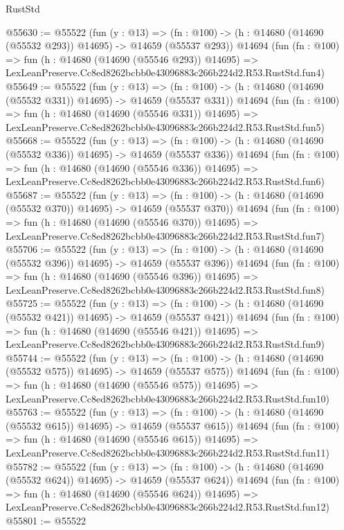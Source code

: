 \begin{lexlean}{RustStd}
\begin{coremodule}
@55630 := @55522
    (fun (y : @13) =>
    (fn : @100) -> (h : @14680 (@14690 (@55532 @293)) @14695) -> @14659 (@55537 @293))
    @14694
    (fun (fn : @100) =>
    fun (h : @14680 (@14690 (@55546 @293)) @14695) =>
    LexLeanPreserve.Cc8ed8262bcbb0e43096883c266b224d2.R53.RustStd.fun4)
@55649 := @55522
    (fun (y : @13) =>
    (fn : @100) -> (h : @14680 (@14690 (@55532 @331)) @14695) -> @14659 (@55537 @331))
    @14694
    (fun (fn : @100) =>
    fun (h : @14680 (@14690 (@55546 @331)) @14695) =>
    LexLeanPreserve.Cc8ed8262bcbb0e43096883c266b224d2.R53.RustStd.fun5)
@55668 := @55522
    (fun (y : @13) =>
    (fn : @100) -> (h : @14680 (@14690 (@55532 @336)) @14695) -> @14659 (@55537 @336))
    @14694
    (fun (fn : @100) =>
    fun (h : @14680 (@14690 (@55546 @336)) @14695) =>
    LexLeanPreserve.Cc8ed8262bcbb0e43096883c266b224d2.R53.RustStd.fun6)
@55687 := @55522
    (fun (y : @13) =>
    (fn : @100) -> (h : @14680 (@14690 (@55532 @370)) @14695) -> @14659 (@55537 @370))
    @14694
    (fun (fn : @100) =>
    fun (h : @14680 (@14690 (@55546 @370)) @14695) =>
    LexLeanPreserve.Cc8ed8262bcbb0e43096883c266b224d2.R53.RustStd.fun7)
@55706 := @55522
    (fun (y : @13) =>
    (fn : @100) -> (h : @14680 (@14690 (@55532 @396)) @14695) -> @14659 (@55537 @396))
    @14694
    (fun (fn : @100) =>
    fun (h : @14680 (@14690 (@55546 @396)) @14695) =>
    LexLeanPreserve.Cc8ed8262bcbb0e43096883c266b224d2.R53.RustStd.fun8)
@55725 := @55522
    (fun (y : @13) =>
    (fn : @100) -> (h : @14680 (@14690 (@55532 @421)) @14695) -> @14659 (@55537 @421))
    @14694
    (fun (fn : @100) =>
    fun (h : @14680 (@14690 (@55546 @421)) @14695) =>
    LexLeanPreserve.Cc8ed8262bcbb0e43096883c266b224d2.R53.RustStd.fun9)
@55744 := @55522
    (fun (y : @13) =>
    (fn : @100) -> (h : @14680 (@14690 (@55532 @575)) @14695) -> @14659 (@55537 @575))
    @14694
    (fun (fn : @100) =>
    fun (h : @14680 (@14690 (@55546 @575)) @14695) =>
    LexLeanPreserve.Cc8ed8262bcbb0e43096883c266b224d2.R53.RustStd.fun10)
@55763 := @55522
    (fun (y : @13) =>
    (fn : @100) -> (h : @14680 (@14690 (@55532 @615)) @14695) -> @14659 (@55537 @615))
    @14694
    (fun (fn : @100) =>
    fun (h : @14680 (@14690 (@55546 @615)) @14695) =>
    LexLeanPreserve.Cc8ed8262bcbb0e43096883c266b224d2.R53.RustStd.fun11)
@55782 := @55522
    (fun (y : @13) =>
    (fn : @100) -> (h : @14680 (@14690 (@55532 @624)) @14695) -> @14659 (@55537 @624))
    @14694
    (fun (fn : @100) =>
    fun (h : @14680 (@14690 (@55546 @624)) @14695) =>
    LexLeanPreserve.Cc8ed8262bcbb0e43096883c266b224d2.R53.RustStd.fun12)
@55801 := @55522

\end{coremodule}
\end{lexlean}
